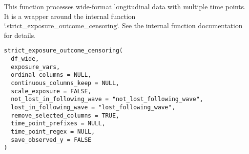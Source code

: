 \documentclass[a4paper]{book}
\begin{document}
%
\begin{Description}
This function processes wide-format longitudinal data with multiple time points.
It is a wrapper around the internal function `.strict\_exposure\_outcome\_censoring`.
See the internal function documentation for details.
\end{Description}
%
\begin{Usage}
\begin{verbatim}
strict_exposure_outcome_censoring(
  df_wide,
  exposure_vars,
  ordinal_columns = NULL,
  continuous_columns_keep = NULL,
  scale_exposure = FALSE,
  not_lost_in_following_wave = "not_lost_following_wave",
  lost_in_following_wave = "lost_following_wave",
  remove_selected_columns = TRUE,
  time_point_prefixes = NULL,
  time_point_regex = NULL,
  save_observed_y = FALSE
)
\end{verbatim}
\end{Usage}
%
\end{document}
